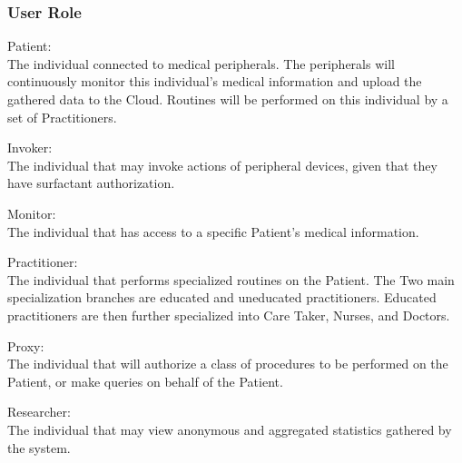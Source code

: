 \subsubsection{User Role}
\begin{description}
	\item Patient:\\ The individual connected to medical peripherals. The peripherals will continuously monitor this individual's medical information and upload the gathered data to the Cloud. Routines will be performed on this individual by a set of Practitioners.
	\item Invoker:\\ The individual that may invoke actions of peripheral devices, given that they have surfactant authorization.
	\item Monitor:\\ The individual that has access to a specific Patient's medical information.
	\item Practitioner:\\ The individual that performs specialized routines on the Patient. The Two main specialization branches are educated and uneducated practitioners. Educated practitioners are then further specialized into Care Taker, Nurses, and Doctors.
	\item Proxy:\\ The individual that will authorize a class of procedures to be performed on the Patient, or make queries on behalf of the Patient.
	\item Researcher:\\ The individual that may view anonymous and aggregated statistics gathered by the system.
\end{description}
